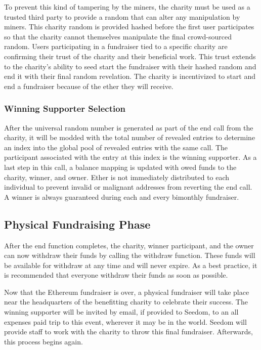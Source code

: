 \documentclass[11pt]{article}
\begin{document}
To prevent this kind of tampering by the miners, the charity must be used as a trusted third party to provide a random that can alter any manipulation by miners. This charity random is provided hashed before the first user participates so that the charity cannot themselves manipulate the final crowd-sourced random. Users participating in a fundraiser tied to a specific charity are confirming their trust of the charity and their beneficial work. This trust extends to the charity's ability to seed start the fundraiser with their hashed random and end it with their final random revelation. The charity is incentivized to start and end a fundraiser because of the ether they will receive.

\subsubsection{Winning Supporter Selection}

After the universal random number is generated as part of the end call from the charity, it will be modded with the total number of revealed entries to determine an index into the global pool of revealed entries with the same call. The participant associated with the entry at this index is the winning supporter. As a last step in this call, a balance mapping is updated with owed funds to the charity, winner, and owner. Ether is not immediately distributed to each individual to prevent invalid or malignant addresses from reverting the end call. A winner is always guaranteed during each and every bimonthly fundraiser.

\subsection{Physical Fundraising Phase}

After the end function completes, the charity, winner participant, and the owner can now withdraw their funds by calling the withdraw function. These funds will be available for withdraw at any time and will never expire. As a best practice, it is recommended that everyone withdraw their funds as soon as possible.

Now that the Ethereum fundraiser is over, a physical fundraiser will take place near the headquarters of the benefitting charity to celebrate their success. The winning supporter will be invited by email, if provided to Seedom, to an all expenses paid trip to this event, wherever it may be in the world. Seedom will provide staff to work with the charity to throw this final fundraiser. Afterwards, this process begins again.
\end{document}
